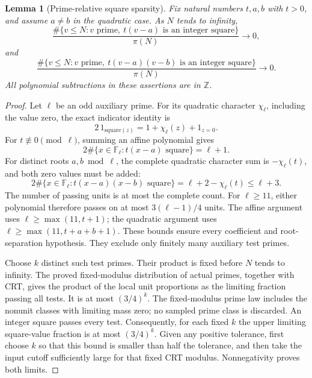 \documentclass[11pt]{article}
\newtheorem{lemma}[theorem]{Lemma}
\begin{document}
\begin{lemma}[Prime-relative square sparsity]
Fix natural numbers \(t,a,b\) with \(t>0\), and assume \(a\ne b\) in the
quadratic case. As \(N\) tends to infinity,
\[
 \frac{\#\{v\le N:v\text{ prime},\ t(v-a)\text{ is an integer square}\}}
      {\pi(N)}\longrightarrow0,
\]
and
\[
 \frac{\#\{v\le N:v\text{ prime},\
                t(v-a)(v-b)\text{ is an integer square}\}}
      {\pi(N)}\longrightarrow0.
\]
All polynomial subtractions in these assertions are in \(\mathbb Z\).
\end{lemma}
\begin{proof}
Let \(\ell\) be an odd auxiliary prime. For its quadratic character
\(\chi_\ell\), including the value zero, the exact indicator identity is
\[
 2\,1_{\mathrm{square}(z)}
   =1+\chi_\ell(z)+1_{z=0}.
\]
For \(t\not\equiv0\pmod\ell\), summing an affine polynomial gives
\[
 2\#\{x\in\mathbb F_\ell:t(x-a)\text{ square}\}=\ell+1.
\]
For distinct roots \(a,b\bmod\ell\), the complete quadratic character
sum is \(-\chi_\ell(t)\), and both zero values must be added:
\[
 2\#\{x\in\mathbb F_\ell:t(x-a)(x-b)\text{ square}\}
     =\ell+2-\chi_\ell(t)\le\ell+3.
\]
The number of passing units is at most the complete count. For
\(\ell\ge11\), either polynomial therefore passes on at most
\(3(\ell-1)/4\) units. The affine argument uses
\(\ell\ge\max(11,t+1)\); the quadratic argument uses
\(\ell\ge\max(11,t+a+b+1)\). These bounds ensure every coefficient
and root-separation hypothesis. They exclude only finitely many
auxiliary test primes.

Choose \(k\) distinct such test primes. Their product is fixed before
\(N\) tends to infinity. The proved fixed-modulus distribution of
actual primes, together with CRT, gives the product of the local
unit proportions as the limiting fraction passing all tests. It is
at most \((3/4)^k\). The fixed-modulus prime law includes the
nonunit classes with limiting mass zero; no sampled prime class
is discarded. An integer square passes every test. Consequently,
for each fixed \(k\) the upper limiting square-value fraction is at
most \((3/4)^k\). Given any positive tolerance, first choose \(k\)
so that this bound is smaller than half the tolerance, and then
take the input cutoff sufficiently large for that fixed CRT
modulus. Nonnegativity proves both limits.
\end{proof}
\end{document}
